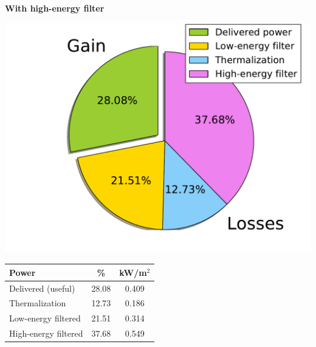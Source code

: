 \documentclass{beamer}
\begin{document}
\begin{frame}
\begin{columns}
\begin{column}{0.48\textwidth}
 \begin{center}
    \textbf{With high-energy filter}

  \includegraphics[width=1.0\textwidth]{figures/bar_chart/pie_cart2.pdf} 

  \tiny
  \begin{tabular}{l||c||c}
    Power                &   \%    &  kW/m$^2$\\
    \hline
    \hline
    Delivered (useful)   & 28.08   & 0.409 \\
    Thermalization       & 12.73   & 0.186 \\
    Low-energy filtered  & 21.51   & 0.314 \\
    High-energy filtered & 37.68   & 0.549 \\
  \end{tabular}

 \end{center}
\end{column}

\end{columns}

\end{frame}
\end{document}
